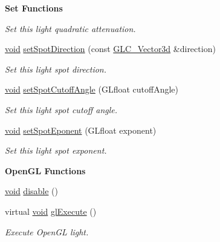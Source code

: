 \begin{Indent}{\bf Set Functions}
\begin{DoxyCompactItemize}
\begin{DoxyCompactList}\small\item\em Set this light quadratic attenuation. \end{DoxyCompactList}\item 
\hyperlink{group___u_a_v_objects_plugin_ga444cf2ff3f0ecbe028adce838d373f5c}{void} \hyperlink{class_g_l_c___light_aa4db408bb283450c805f8518ce572548}{set\-Spot\-Direction} (const \hyperlink{class_g_l_c___vector3d}{G\-L\-C\-\_\-\-Vector3d} \&direction)
\begin{DoxyCompactList}\small\item\em Set this light spot direction. \end{DoxyCompactList}\item 
\hyperlink{group___u_a_v_objects_plugin_ga444cf2ff3f0ecbe028adce838d373f5c}{void} \hyperlink{class_g_l_c___light_a5211658122a0d97122138f30cc8b8bf0}{set\-Spot\-Cutoff\-Angle} (G\-Lfloat cutoff\-Angle)
\begin{DoxyCompactList}\small\item\em Set this light spot cutoff angle. \end{DoxyCompactList}\item 
\hyperlink{group___u_a_v_objects_plugin_ga444cf2ff3f0ecbe028adce838d373f5c}{void} \hyperlink{class_g_l_c___light_a58d93cda120a0a27b2c878a6399589a1}{set\-Spot\-Eponent} (G\-Lfloat exponent)
\begin{DoxyCompactList}\small\item\em Set this light spot exponent. \end{DoxyCompactList}\end{DoxyCompactItemize}
\end{Indent}
\begin{Indent}{\bf Open\-G\-L Functions}\par
\begin{DoxyCompactItemize}
\item 
\hyperlink{group___u_a_v_objects_plugin_ga444cf2ff3f0ecbe028adce838d373f5c}{void} \hyperlink{class_g_l_c___light_a70f5256ab0134b958c1979d970e37779}{disable} ()
\item 
virtual \hyperlink{group___u_a_v_objects_plugin_ga444cf2ff3f0ecbe028adce838d373f5c}{void} \hyperlink{class_g_l_c___light_a02812d66b0a3be7817501493a6ef3bea}{gl\-Execute} ()
\begin{DoxyCompactList}\small\item\em Execute Open\-G\-L light. \end{DoxyCompactList}\end{DoxyCompactItemize}
\end{Indent}
